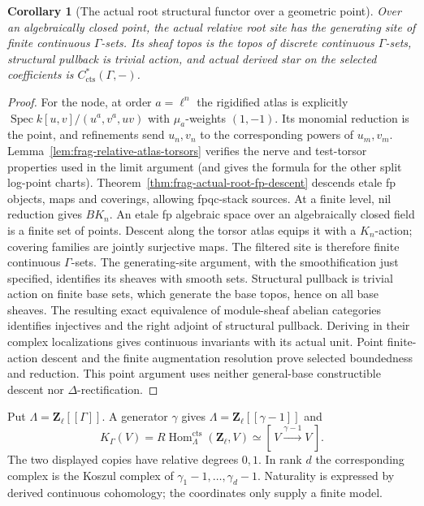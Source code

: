 \documentclass[11pt]{article}
\newtheorem{corollary}[theorem]{Corollary}
\theoremstyle{definition}
\theoremstyle{remark}
\begin{document}
\begin{corollary}[The actual root structural functor over a geometric point]
\label{cor:frag-point-actual-root-bridge}
Over an algebraically closed point, the actual relative root site has
the generating site of finite continuous $\Gamma$-sets.  Its sheaf
topos is the topos of discrete continuous $\Gamma$-sets, structural
pullback is trivial action, and actual derived star on the selected
coefficients is $C^*_{\mathrm{cts}}(\Gamma,-)$.
\end{corollary}
\begin{proof}
For the node, at order $a=\ell^n$ the rigidified atlas is explicitly
$\operatorname{Spec}k[u,v]/(u^a,v^a,uv)$ with $\mu_a$-weights
$(1,-1)$.  Its monomial reduction is the point, and refinements
send $u_n,v_n$ to the corresponding powers of $u_m,v_m$.
Lemma~\ref{lem:frag-relative-atlas-torsors} verifies the nerve and
test-torsor properties used in the limit argument (and gives the
formula for the other split log-point charts).
Theorem~\ref{thm:frag-actual-root-fp-descent} descends etale fp objects,
maps and coverings, allowing fpqc-stack sources.  At a finite level,
nil reduction gives $BK_n$.  An etale fp algebraic space over an
algebraically closed field is a finite set of points.  Descent along
the torsor atlas equips it with a $K_n$-action; covering families
are jointly surjective maps.  The filtered site is therefore finite
continuous $\Gamma$-sets.  The generating-site argument, with the
smoothification just specified, identifies its sheaves with smooth
sets.  Structural pullback is trivial action on finite base sets,
which generate the base topos, hence on all base sheaves.
The resulting exact equivalence of module-sheaf abelian categories
identifies injectives and the right adjoint of structural pullback.
Deriving in their complex localizations gives continuous invariants
with its actual unit.  Point finite-action descent and the finite
augmentation resolution prove selected boundedness and reduction.
This point argument uses neither general-base constructible descent
nor $\Delta$-rectification.
\end{proof}


Put $\Lambda=\mathbf Z_\ell[[\Gamma]]$.  A generator $\gamma$ gives
$\Lambda=\mathbf Z_\ell[[\gamma-1]]$ and
\[
 K_\Gamma(V)=R\operatorname{Hom}^{\mathrm{cts}}_\Lambda(\mathbf Z_\ell,V)
 \simeq [\,V\xrightarrow{\gamma-1}V\,].
\]
The two displayed copies have relative degrees $0,1$.  In rank $d$
the corresponding complex is the Koszul complex of
$\gamma_1-1,\ldots,\gamma_d-1$.  Naturality is expressed by derived
continuous cohomology; the coordinates only supply a finite model.
\end{document}
